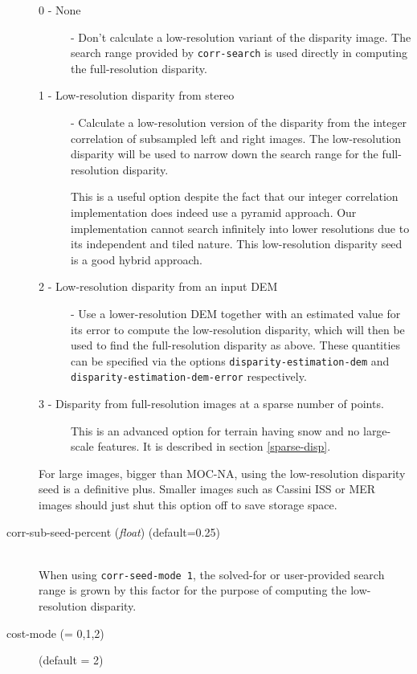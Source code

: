 \begin{description}
  \begin{description}
  \item[0 - None] - Don't calculate a low-resolution variant of the
    disparity image. The search range provided by \texttt{corr-search}
    is used directly in computing the full-resolution disparity.

  \item[1 - Low-resolution disparity from stereo] - Calculate a
    low-resolution version of the disparity from the integer correlation
    of subsampled left and right images.  The low-resolution disparity
    will be used to narrow down the search range for the full-resolution
    disparity.

    This is a useful option despite the fact that our integer
    correlation implementation does indeed use a pyramid approach. Our
    implementation cannot search infinitely into lower resolutions due
    to its independent and tiled nature. This low-resolution disparity
    seed is a good hybrid approach.

  \item[2 - Low-resolution disparity from an input DEM] - Use a
    lower-resolution DEM together with an estimated value for its error
    to compute the low-resolution disparity, which will then be used to
    find the full-resolution disparity as above. These quantities can be
    specified via the options \texttt{disparity-estimation-dem} and
    \texttt{disparity-estimation-dem-error} respectively.

  \item[3 - Disparity from full-resolution images at a sparse number of
    points.] This is an advanced option for terrain having snow and no
    large-scale features. It is described in section \ref{sparse-disp}.

  \end{description}

  For large images, bigger than MOC-NA, using the low-resolution
  disparity seed is a definitive plus. Smaller images such as Cassini
  ISS or MER images should just shut this option off to save storage
  space.

\item[corr-sub-seed-percent \textnormal{\small{(\emph{float})}} (default=0.25)] \hfill \\
  When using \texttt{corr-seed-mode 1}, the solved-for or user-provided
  search range is grown by this factor for the purpose of computing the
  low-resolution disparity.

\item[cost-mode \textnormal{\small{(= 0,1,2)}}] (default = 2) \hfill \\


\end{description}
